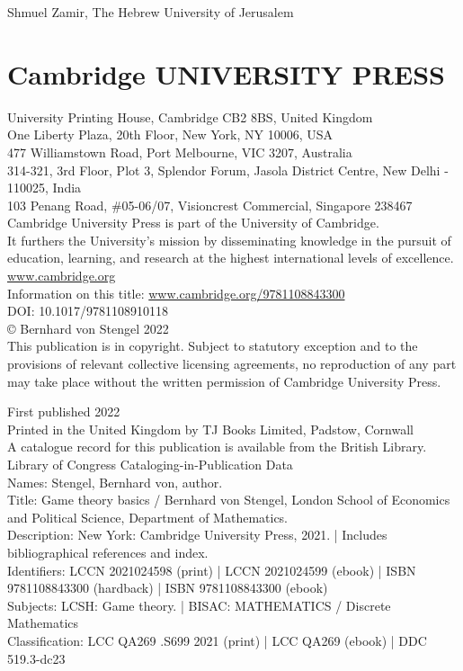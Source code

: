 \documentclass[12pt]{article}
\begin{document}
Shmuel Zamir, The Hebrew University of Jerusalem



\section*{Cambridge UNIVERSITY PRESS}
University Printing House, Cambridge CB2 8BS, United Kingdom\\
One Liberty Plaza, 20th Floor, New York, NY 10006, USA\\
477 Williamstown Road, Port Melbourne, VIC 3207, Australia\\
314-321, 3rd Floor, Plot 3, Splendor Forum, Jasola District Centre, New Delhi - 110025, India\\
103 Penang Road, \#05-06/07, Visioncrest Commercial, Singapore 238467\\
Cambridge University Press is part of the University of Cambridge.\\
It furthers the University's mission by disseminating knowledge in the pursuit of education, learning, and research at the highest international levels of excellence.\\
\href{http://www.cambridge.org}{www.cambridge.org}\\
Information on this title: \href{http://www.cambridge.org/9781108843300}{www.cambridge.org/9781108843300}\\
DOI: 10.1017/9781108910118\\
© Bernhard von Stengel 2022\\
This publication is in copyright. Subject to statutory exception and to the provisions of relevant collective licensing agreements, no reproduction of any part may take place without the written permission of Cambridge University Press.

First published 2022\\
Printed in the United Kingdom by TJ Books Limited, Padstow, Cornwall\\
A catalogue record for this publication is available from the British Library.\\
Library of Congress Cataloging-in-Publication Data\\
Names: Stengel, Bernhard von, author.\\
Title: Game theory basics / Bernhard von Stengel, London School of Economics and Political Science, Department of Mathematics.\\
Description: New York: Cambridge University Press, 2021. | Includes bibliographical references and index.\\
Identifiers: LCCN 2021024598 (print) | LCCN 2021024599 (ebook) | ISBN 9781108843300 (hardback) | ISBN 9781108843300 (ebook)\\
Subjects: LCSH: Game theory. | BISAC: MATHEMATICS / Discrete Mathematics\\
Classification: LCC QA269 .S699 2021 (print) | LCC QA269 (ebook) | DDC 519.3-dc23
\end{document}
